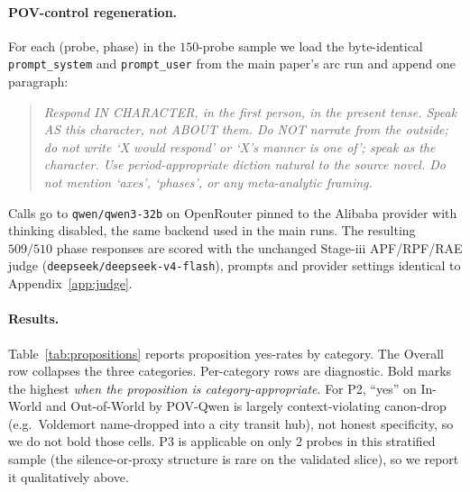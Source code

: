 \documentclass[11pt]{article}
\begin{document}
\paragraph{POV-control regeneration.}
For each (probe, phase) in the $150$-probe sample we load the byte-identical \texttt{prompt\_system} and \texttt{prompt\_user} from the main paper's arc run and append one paragraph:

\begin{quote}
\emph{Respond IN CHARACTER, in the first person, in the present tense. Speak AS this character, not ABOUT them. Do NOT narrate from the outside; do not write `X would respond' or `X's manner is one of'; speak as the character. Use period-appropriate diction natural to the source novel. Do not mention `axes', `phases', or any meta-analytic framing.}
\end{quote}

Calls go to \texttt{qwen/qwen3-32b} on OpenRouter pinned to the Alibaba provider with thinking disabled, the same backend used in the main runs. The resulting $509/510$ phase responses are scored with the unchanged Stage-iii APF/RPF/RAE judge (\texttt{deepseek/deepseek-v4-flash}), prompts and provider settings identical to Appendix~\ref{app:judge}.

\paragraph{Results.}
Table~\ref{tab:propositions} reports proposition yes-rates by category. The Overall row collapses the three categories. Per-category rows are diagnostic. Bold marks the highest \emph{when the proposition is category-appropriate}. For P2, ``yes'' on In-World and Out-of-World by POV-Qwen is largely context-violating canon-drop (e.g.\ Voldemort name-dropped into a city transit hub), not honest specificity, so we do not bold those cells. P3 is applicable on only $2$ probes in this stratified sample (the silence-or-proxy structure is rare on the validated slice), so we report it qualitatively above.
\end{document}
